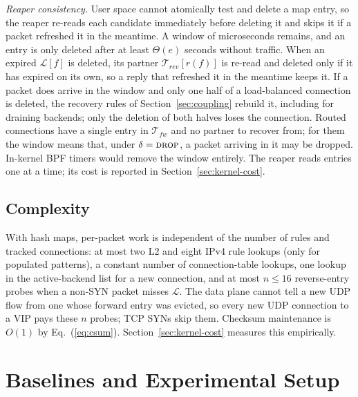 \documentclass[conference]{IEEEtran}
\begin{document}
\textit{Reaper consistency.}
\label{sec:reaper}
User space cannot atomically test and delete a map entry, so the reaper
re-reads each candidate immediately before deleting it and skips it if a
packet refreshed it in the meantime. A window of microseconds remains, and an
entry is only deleted after at least $\Theta(e)$ seconds without traffic.
When an expired $\mathcal{L}[f]$ is deleted, its partner
$\mathcal{T}_{rev}[r(f)]$ is re-read and deleted only if it has expired on its
own, so a reply that refreshed it in the meantime keeps it. If a packet does
arrive in the window and only one half of a load-balanced connection is
deleted, the recovery rules of Section~\ref{sec:coupling} rebuild it,
including for draining backends; only the deletion of both halves loses the
connection. Routed connections have a single entry in $\mathcal{T}_{fw}$ and
no partner to recover from; for them the window means that, under
$\delta=\textsc{drop}$, a packet arriving in it may be dropped. In-kernel BPF timers would remove the window entirely.
The reaper reads entries one at a time; its cost is reported in
Section~\ref{sec:kernel-cost}.

\subsection{Complexity}
\label{sec:complexity}
With hash maps, per-packet work is independent of the number of rules and
tracked connections: at most two L2 and eight IPv4 rule lookups (only for
populated patterns), a constant number of connection-table lookups, one
lookup in the active-backend list for a new connection, and at most $n \le 16$
reverse-entry probes when a non-SYN packet misses $\mathcal{L}$. The data
plane cannot tell a new UDP flow from one whose forward entry was evicted, so
every new UDP connection to a VIP pays these $n$ probes; TCP SYNs skip them. Checksum
maintenance is $O(1)$ by Eq.~(\ref{eq:csum}). Section~\ref{sec:kernel-cost}
measures this empirically.

\section{Baselines and Experimental Setup}
\label{sec:setup}
\end{document}
